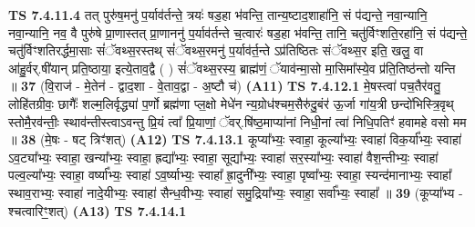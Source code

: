 \documentclass[17pt]{extarticle}
\begin{document}
                                \textbf{ TS 7.4.11.4} \newline
                  तत् पुरु॑ष॒मनु॑ प॒र्याव॑र्तन्ते॒ त्रयः॑ षड॒हा भ॑वन्ति॒ तान्य॒ष्टाद॒शाहा॑नि॒ सं प॑द्यन्ते॒ नवा॒न्यानि॒ नवा॒न्यानि॒ नव॒ वै पुरु॑षे प्रा॒णास्तत् प्रा॒णाननु॑ प॒र्याव॑र्तन्ते च॒त्वारः॑ षड॒हा भ॑वन्ति॒ तानि॒ चतु॑र्विꣳशति॒रहा॑नि॒ सं प॑द्यन्ते॒ चतु॑र्विꣳशतिरर्द्धमा॒साः सं॑ॅवथ्स॒रस्तथ् सं॑ॅवथ्स॒रमनु॑ प॒र्याव॑र्त॒न्ते ऽप्र॑तिष्ठितः संॅवथ्स॒र इति॒ खलु॒ वा आ॑हु॒र्वर्.षी॑यान् प्रति॒ष्ठाया॒ इत्ये॒ताव॒द्वै ( ) सं॑ॅवथ्स॒रस्य॒ ब्राह्म॑णं॒ ॅयाव॑न्मा॒सो मा॒सिमा᳚स्ये॒व प्र॑ति॒तिष्ठ॑न्तो यन्ति ॥ \textbf{  37} \newline
                  \newline
                      (वि॒राज॑ - मे॒तेन॑ - द्वाद॒शा - वे॒ताव॒द्वा - अ॒ष्टौ च॑)  \textbf{(A11)} \newline \newline
                                        \textbf{ TS 7.4.12.1} \newline
                  मे॒षस्त्वा॑ पच॒तैर॑वतु॒ लोहि॑तग्रीवः॒ छागैः᳚ शल्म॒लिर्वृद्ध्या॑ प॒र्णो ब्रह्म॑णा प्ल॒क्षो मेधे॑न न्य॒ग्रोध॑श्चम॒सैरु॑दु॒बंर॑ ऊ॒र्जा गा॑य॒त्री छन्दो॑भिस्त्रि॒वृथ् स्तोमै॒रव॑न्तीः॒ स्थाव॑न्तीस्त्वाऽवन्तु प्रि॒यं त्वा᳚ प्रि॒याणां॒ ॅवर्.षि॑ष्ठ॒माप्या॑नां निधी॒नां त्वा॑ निधि॒पतिꣳ॑ हवामहे वसो मम ॥ \textbf{  38} \newline
                  \newline
                      (मे॒षः - षट् त्रिꣳ॑शत्)  \textbf{(A12)} \newline \newline
                                        \textbf{ TS 7.4.13.1} \newline
                  कूप्या᳚भ्यः॒ स्वाहा॒ कूल्या᳚भ्यः॒ स्वाहा॑ विक॒र्या᳚भ्यः॒ स्वाहा॑ ऽव॒ट्या᳚भ्यः॒ स्वाहा॒ खन्या᳚भ्यः॒ स्वाहा॒ ह्रद्या᳚भ्यः॒ स्वाहा॒ सूद्या᳚भ्यः॒ स्वाहा॑ सर॒स्या᳚भ्यः॒ स्वाहा॑ वैश॒न्तीभ्यः॒ स्वाहा॑ पल्व॒ल्या᳚भ्यः॒ स्वाहा॒ वर्ष्या᳚भ्यः॒ स्वाहा॑ ऽव॒र्ष्याभ्यः॒ स्वाहा᳚ ह्रा॒दुनी᳚भ्यः॒ स्वाहा॒ पृष्वा᳚भ्यः॒ स्वाहा॒ स्यन्द॑मानाभ्यः॒ स्वाहा᳚ स्थाव॒राभ्यः॒ स्वाहा॑ नादे॒यीभ्यः॒ स्वाहा॑ सैन्ध॒वीभ्यः॒ स्वाहा॑ समु॒द्रिया᳚भ्यः॒ स्वाहा॒ सर्वा᳚भ्यः॒ स्वाहा᳚ ॥ \textbf{  39} \newline
                  \newline
                      (कूप्या᳚भ्य - श्चत्वारिꣳ॒॒शत्)  \textbf{(A13)} \newline \newline
                                        \textbf{ TS 7.4.14.1} \newline
\end{document}
